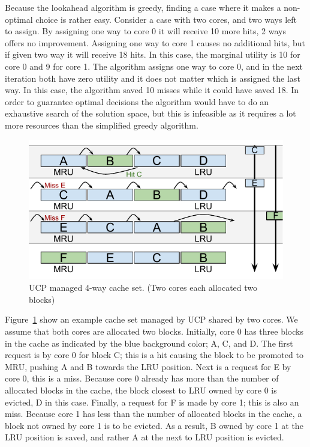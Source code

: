 Because the lookahead algorithm is greedy, finding a case where it makes a non-optimal choice is rather easy.
Consider a case with two cores, and two ways left to assign.
By assigning one way to core 0 it will receive 10 more hits, 2 ways offers no improvement.
Assigning one way to core 1 causes no additional hits, but if given two way it will receive 18 hits.
In this case, the marginal utility is 10 for core 0 and 9 for core 1.
The algorithm assigns one way to core 0, and in the next iteration both have zero utility and it does not matter which is assigned the last way.
In this case, the algorithm saved 10 misses while it could have saved 18.
In order to guarantee optimal decisions the algorithm would have to do an exhaustive search of the solution space, but this is infeasible as it requires a lot more resources than the simplified greedy algorithm.

\begin{figure}[ht]
    \centering
    \includegraphics[width=.65\textwidth]{figures/algorithms/UCP}
    \caption[UCP managed 4-way cache set.]{UCP managed 4-way cache set. (Two cores each allocated two blocks)}
    \label{fig:algorithms:ucp_example}
\end{figure}

Figure~\ref{fig:algorithms:ucp_example} show an example cache set managed by UCP shared by two cores.
We assume that both cores are allocated two blocks.
Initially, core 0 has three blocks in the cache as indicated by the blue background color; A, C, and D.
The first request is by core 0 for block C; this is a hit causing the block to be promoted to MRU, pushing A and B towards the LRU position.
Next is a request for E by core 0, this is a miss.
Because core 0 already has more than the number of allocated blocks in the cache, the block closest to LRU owned by core 0 is evicted, D in this case.
Finally, a request for F is made by core 1; this is also an miss.
Because core 1 has less than the number of allocated blocks in the cache, a block not owned by core 1 is to be evicted.
As a result, B owned by core 1 at the LRU position is saved, and rather A at the next to LRU position is evicted.



